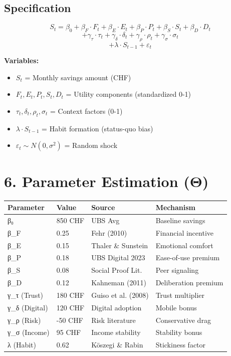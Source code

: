 \documentclass[11pt,a4paper]{article}
\begin{document}
\subsection{Specification}

\[
S_t = \beta_0 + \beta_F \cdot F_t + \beta_E \cdot E_t + \beta_P \cdot P_t + \beta_S \cdot S_t + \beta_D \cdot D_t
\]
\[
+ \gamma_\tau \cdot \tau_t + \gamma_\delta \cdot \delta_t + \gamma_\rho \cdot \rho_t + \gamma_\sigma \cdot \sigma_t
\]
\[
+ \lambda \cdot S_{t-1} + \varepsilon_t
\]

\textbf{Variables:}
\begin{itemize}
\item $S_t$ = Monthly savings amount (CHF)
\item $F_t, E_t, P_t, S_t, D_t$ = Utility components (standardized 0-1)
\item $\tau_t, \delta_t, \rho_t, \sigma_t$ = Context factors (0-1)
\item $\lambda \cdot S_{t-1}$ = Habit formation (status-quo bias)
\item $\varepsilon_t \sim N(0, \sigma^2)$ = Random shock
\end{itemize}

\section{6. Parameter Estimation (Θ)}

\begin{tabular}{llll}
\toprule
Parameter & Value & Source & Mechanism \\
\midrule
β₀ & 850 CHF & UBS Avg & Baseline savings \\
β_F & 0.25 & Fehr (2010) & Financial incentive \\
β_E & 0.15 & Thaler \& Sunstein & Emotional comfort \\
β_P & 0.18 & UBS Digital 2023 & Ease-of-use premium \\
β_S & 0.08 & Social Proof Lit. & Peer signaling \\
β_D & 0.12 & Kahneman (2011) & Deliberation premium \\
γ_τ (Trust) & 180 CHF & Guiso et al. (2008) & Trust multiplier \\
γ_δ (Digital) & 120 CHF & Digital adoption & Mobile bonus \\
γ_ρ (Risk) & -50 CHF & Risk literature & Conservative drag \\
γ_σ (Income) & 95 CHF & Income stability & Stability bonus \\
λ (Habit) & 0.62 & Köszegi \& Rabin & Stickiness factor \\
\bottomrule
\end{tabular}
\end{document}

